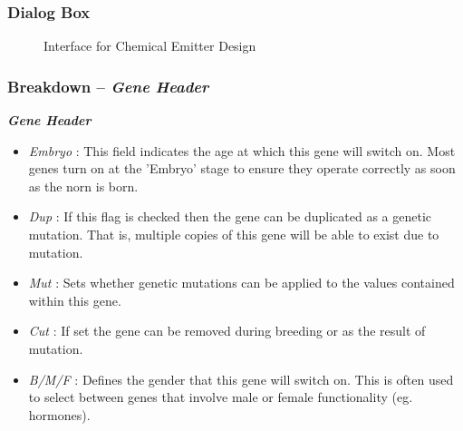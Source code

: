 \documentclass[11pt,twoside,a4paper]{article}
\begin{document}
\begin{minipage}{0.5\linewidth}
\subsubsection{Dialog Box}
\begin{figure}[H]
	\centerline {} %
	\caption{Interface for Chemical Emitter Design}
	\label{fig:chemical_emitter}
\end{figure}
\subsubsection{Breakdown -- \emph{Gene Header}}
\end{minipage}
\begin{minipage}{0.1\linewidth}\end{minipage}
\begin{minipage}{0.45\linewidth}
\textbf{\textit{Gene Header}}~\\
\begin{itemize}
	\item[] \emph{Embryo} : This field indicates the age at which this gene will switch on. Most genes turn on at the 'Embryo' stage to ensure they operate correctly as soon as the norn is born. 
	\item[] \emph{Dup} : If this flag is checked then the gene can be duplicated as a genetic mutation. That is, multiple copies of this gene will be able to exist due to mutation.
	\item[] \emph{Mut} : Sets whether genetic mutations can be applied to the values contained within this gene.
	\item[] \emph{Cut} : If set the gene can be removed during breeding or as the result of mutation. 
	\item[] \emph{B/M/F} : Defines the gender that this gene will switch on. This is often used to select between genes that involve male or female functionality (eg. hormones).
\end{itemize}
\end{minipage}~\\~\\


\end{document}
